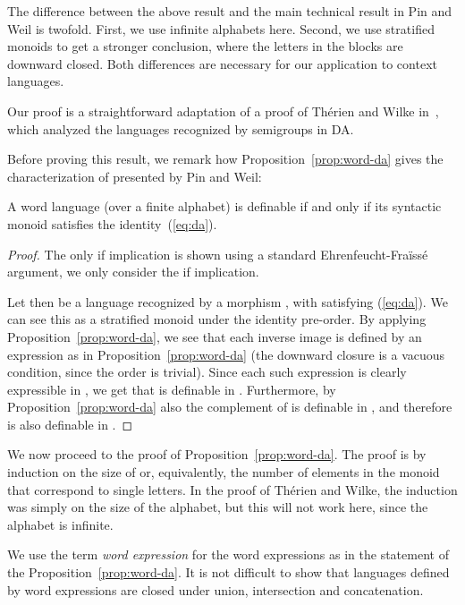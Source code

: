 \documentclass{LMCS}
\begin{document}
The difference between the above result and the main technical result
in Pin and Weil is twofold. First, we use infinite alphabets here.
Second, we use stratified monoids to get a
stronger conclusion, where the letters in the blocks  are
downward closed.  Both differences are necessary for our application
to context languages.

Our proof is a straightforward adaptation of a proof of Th\'erien and Wilke
in~\cite{therienwilkefo2}, which analyzed the languages recognized by
semigroups in DA. 

  Before proving this result, we remark how
  Proposition~\ref{prop:word-da} gives the
characterization of \Dtwo presented by Pin and Weil:
\begin{cor}
  A word language (over a finite alphabet) is definable \Dtwo if and only if
  its syntactic monoid satisfies the identity~(\ref{eq:da}).
\end{cor}
\begin{proof}
  The only if implication is shown using a standard
  Ehrenfeucht-Fraïssé argument, we only consider the if implication.

  Let then  be a language recognized by a morphism
  , with  satisfying (\ref{eq:da}). We can see
  this  as a stratified monoid under the identity pre-order. By
  applying Proposition~\ref{prop:word-da}, we see that each inverse
  image  is defined by an expression as in
  Proposition~\ref{prop:word-da} (the downward closure is a vacuous
  condition, since the order is trivial). Since each such expression
  is clearly expressible in \Stwo, we get that  is definable
  in \Stwo. Furthermore, by Proposition~\ref{prop:word-da} also
  the complement of  is definable in \Stwo, and therefore 
  is also definable in \Ptwo.
\end{proof}


We now proceed to the proof of Proposition~\ref{prop:word-da}.  The proof is by
induction on the size of  or, equivalently, the number of
elements in the monoid that correspond to single letters. In the proof
of Thérien and Wilke, the induction was simply on the size of the alphabet,
but this will not work here, since the alphabet is infinite.

 We use the term
\emph{ word expression} for the word expressions as in the
statement of the Proposition~\ref{prop:word-da}. It is not difficult to
show that languages defined by  word expressions are closed under
union, intersection and concatenation.
\end{document}
